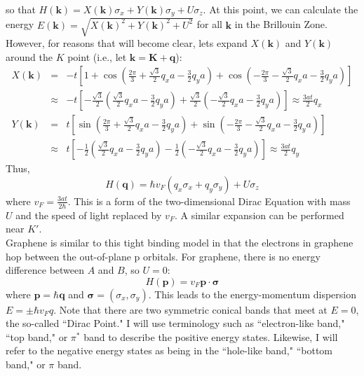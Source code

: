 \documentclass[a4paper,12pt]{article}
\renewcommand{\vec}[1]{\boldsymbol{\mathbf{#1}}}
\begin{document}
so that $H(\vec{k})=X(\vec{k}) \sigma_x + Y(\vec{k}) \sigma_y+U \sigma_z$.  At this point, we can calculate the energy $E(\vec{k})=\sqrt{X(\vec{k})^2+Y(\vec{k})^2+U^2}$ for all $\vec{k}$ in the Brillouin Zone.  However, for reasons that will become clear, lets expand $X(\vec{k})$ and $Y(\vec{k})$ around the $K$ point (i.e., let $\vec{k}=\vec{K}+\vec{q}$):
\begin{eqnarray}
X(\vec{k}) &=& -t \left[ 1+ \cos \left(\frac{2 \pi}{3} + \frac{\sqrt{3}}{2}q_x a - \frac{3}{2}q_y a \right) + \cos \left( -\frac{2 \pi}{3} - \frac{\sqrt{3}}{2}q_x a - \frac{3}{2}q_y a \right) \right] \nonumber \\
&\approx& -t \left[ -\frac{\sqrt{3}}{2} \left( \frac{\sqrt{3}}{2}q_x a - \frac{3}{2}q_y a \right) + \frac{\sqrt{3}}{2} \left( -\frac{\sqrt{3}}{2}q_x a - \frac{3}{2}q_y a \right) \right] \approx \frac{3at}{2} q_x \\
Y(\vec{k}) &=& t \left[ \sin \left(\frac{2 \pi}{3} + \frac{\sqrt{3}}{2}q_x a - \frac{3}{2}q_y a \right) + \sin \left( -\frac{2 \pi}{3} - \frac{\sqrt{3}}{2}q_x a - \frac{3}{2}q_y a \right) \right] \nonumber \\
&\approx& t \left[ -\frac{1}{2} \left( \frac{\sqrt{3}}{2}q_x a - \frac{3}{2}q_y a \right) - \frac{1}{2} \left( -\frac{\sqrt{3}}{2}q_x a - \frac{3}{2}q_y a \right) \right] \approx \frac{3at}{2} q_y
\end{eqnarray}
Thus,
\begin{equation}
H(\vec{q})=\hbar v_F \left( q_x \sigma_x + q_y \sigma_y \right) + U \sigma_z
\end{equation}
where $v_F=\frac{3at}{2\hbar}$.  This is a form of the two-dimensional Dirac Equation with mass $U$ and the speed of light replaced by $v_F$.  A similar expansion can be performed near $K'$. \\
Graphene is similar to this tight binding model in that the electrons in graphene hop between the out-of-plane p orbitals.  For graphene, there is no energy difference between $A$ and $B$, so $U=0$:
\begin{equation}
H(\vec{p})= v_F \vec{p} \cdot \vec{\sigma}
\end{equation}
where $\vec{p}=\hbar \vec{q}$ and $\vec{\sigma}=(\sigma_x,\sigma_y)$.  This leads to the energy-momentum dispersion $E=\pm \hbar v_F q$.  Note that there are two symmetric conical bands that meet at $E=0$, the so-called ``Dirac Point."  I will use terminology such as ``electron-like band," ``top band," or $\pi^*$ band to describe the positive energy states.  Likewise, I will refer to the negative energy states as being in the ``hole-like band," ``bottom band," or $\pi$ band. \\
\end{document}
